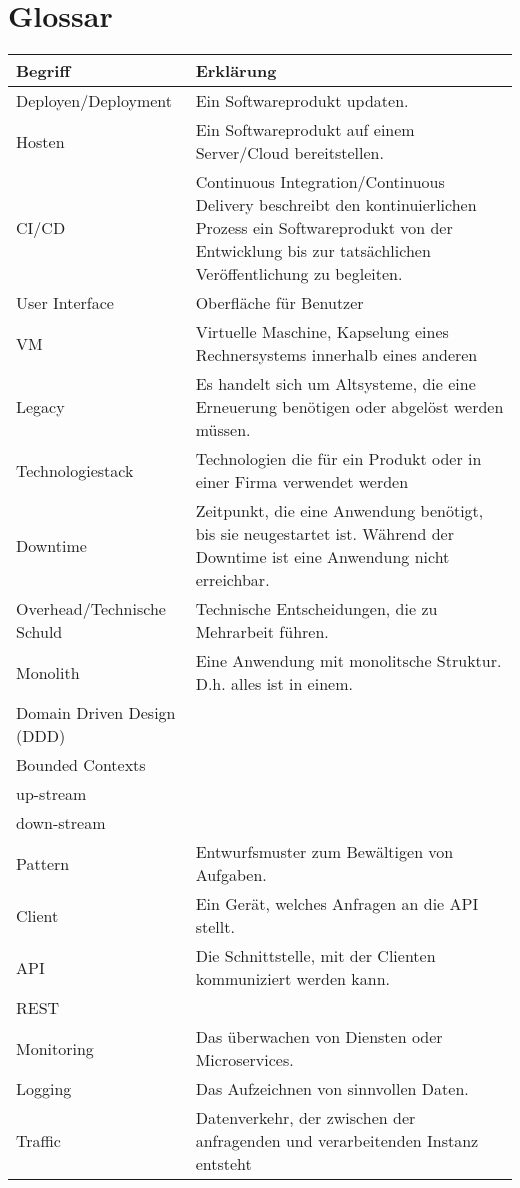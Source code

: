\section{Glossar}
\begin{longtable}{lp{10cm}}
	Begriff & Erklärung \\ \hline
	Deployen/Deployment & Ein Softwareprodukt updaten.  \\
	Hosten & Ein Softwareprodukt auf einem Server/Cloud bereitstellen. \\
	CI/CD & Continuous Integration/Continuous Delivery beschreibt den kontinuierlichen Prozess ein Softwareprodukt von der Entwicklung bis zur tatsächlichen Veröffentlichung zu begleiten.\\
	User Interface  & Oberfläche für Benutzer  \\
	VM & Virtuelle Maschine, Kapselung eines Rechnersystems innerhalb eines anderen  \\
	Legacy & Es handelt sich um Altsysteme, die eine Erneuerung benötigen oder abgelöst werden müssen. \\
	Technologiestack & Technologien die für ein Produkt oder in einer Firma verwendet werden  \\
	Downtime & Zeitpunkt, die eine Anwendung benötigt, bis sie neugestartet ist. Während der Downtime ist eine Anwendung nicht erreichbar.  \\
	Overhead/Technische Schuld & Technische Entscheidungen, die zu Mehrarbeit führen. \\
	Monolith & Eine Anwendung mit monolitsche Struktur. D.h. alles ist in einem. \\ 
	Domain Driven Design (DDD) &  \\	
	Bounded Contexts & \\
	up-stream & \\
	down-stream & \\
	Pattern & Entwurfsmuster zum Bewältigen von Aufgaben.\\
	Client & Ein Gerät, welches Anfragen an die API stellt. \\
	API & Die Schnittstelle, mit der Clienten kommuniziert werden kann.\\
	REST & \\
	Monitoring & Das überwachen von Diensten oder Microservices.\\
	Logging & Das Aufzeichnen von sinnvollen Daten.\\
	Traffic & Datenverkehr, der zwischen der anfragenden und verarbeitenden Instanz entsteht\\

\end{longtable}

